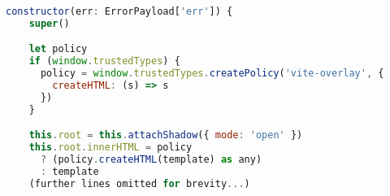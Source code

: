 \begin{itemize}
\begin{lstlisting}[language=JavaScript, caption=Creation of error overlay using Trusted Types policy \cite{commit_vite_policy_overlay}]
  constructor(err: ErrorPayload['err']) {
    super()

    let policy
    if (window.trustedTypes) {
      policy = window.trustedTypes.createPolicy('vite-overlay', {
        createHTML: (s) => s
      })
    }

    this.root = this.attachShadow({ mode: 'open' })
    this.root.innerHTML = policy
      ? (policy.createHTML(template) as any)
      : template
    (further lines omitted for brevity...)
\end{lstlisting}


\end{itemize}
